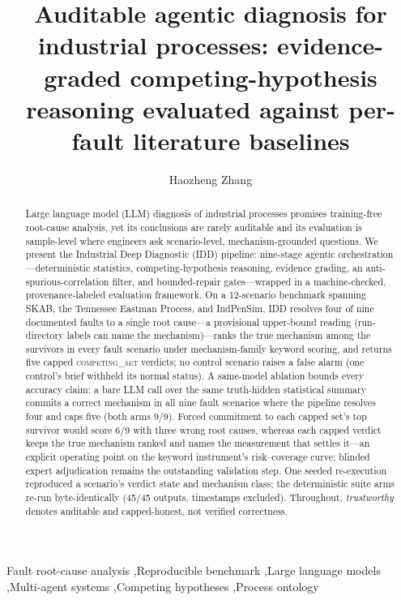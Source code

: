 \documentclass[preprint,12pt]{elsarticle}
\begin{document}
\title{Auditable agentic diagnosis for industrial processes: evidence-graded competing-hypothesis reasoning evaluated against per-fault literature baselines}

\author[ustc]{Haozheng Zhang}
\address[ustc]{Institute of Advanced Technology, University of Science and Technology of China, Hefei 230088, China}

\begin{frontmatter}
\begin{abstract}
Large language model (LLM) diagnosis of industrial processes promises training-free root-cause analysis, yet its conclusions are rarely auditable and its evaluation is sample-level where engineers ask scenario-level, mechanism-grounded questions. We present the Industrial Deep Diagnostic (IDD) pipeline: nine-stage agentic orchestration---deterministic statistics, competing-hypothesis reasoning, evidence grading, an anti-spurious-correlation filter, and bounded-repair gates---wrapped in a machine-checked, provenance-labeled evaluation framework. On a 12-scenario benchmark spanning SKAB, the Tennessee Eastman Process, and IndPenSim, IDD resolves four of nine documented faults to a single root cause---a provisional upper-bound reading (run-directory labels can name the mechanism)---ranks the true mechanism among the survivors in every fault scenario under mechanism-family keyword scoring, and returns five capped \mbox{\textsc{competing\_set}} verdicts; no control scenario raises a false alarm (one control's brief withheld its normal status). A same-model ablation bounds every accuracy claim: a bare LLM call over the same truth-hidden statistical summary commits a correct mechanism in all nine fault scenarios where the pipeline resolves four and caps five (both arms 9/9). Forced commitment to each capped set's top survivor would score 6/9 with three wrong root causes, whereas each capped verdict keeps the true mechanism ranked and names the measurement that settles it---an explicit operating point on the keyword instrument's risk--coverage curve; blinded expert adjudication remains the outstanding validation step. One seeded re-execution reproduced a scenario's verdict state and mechanism class; the deterministic suite arms re-run byte-identically (45/45 outputs, timestamps excluded). Throughout, \emph{trustworthy} denotes auditable and capped-honest, not verified correctness.
\end{abstract}

\begin{keyword}
Fault root-cause analysis \sep Reproducible benchmark \sep Large language models \sep Multi-agent systems \sep Competing hypotheses \sep Process ontology
\end{keyword}

\end{frontmatter}
\end{document}
